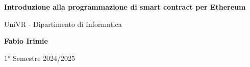 \begin{titlepage}
	\begin{center}
		\vspace*{1cm}

		\Huge
		\textbf{Introduzione alla programmazione di smart contract per Ethereum}

		\vspace{0.5cm}
		\LARGE
		UniVR - Dipartimento di Informatica

		\vspace{1.5cm}

		\textbf{Fabio Irimie}

		\vfill


		\vspace{0.8cm}


		1° Semestre 2024/2025

	\end{center}
\end{titlepage}
